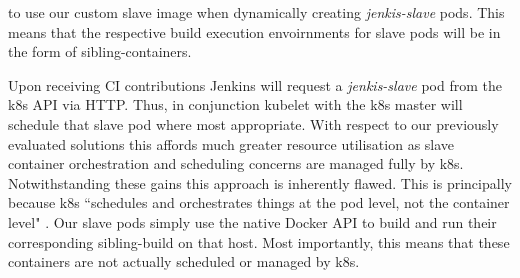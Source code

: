 \documentclass{report}
\begin{document}
to use our custom slave image when dynamically creating \textit{jenkis-slave} pods. 
This means that the respective build execution envoirnments for slave pods will be in the form of sibling-containers. 
\par
Upon receiving CI contributions Jenkins will request a \textit{jenkis-slave} pod from the k8s API via HTTP. 
Thus, in conjunction kubelet with the k8s master will schedule that slave pod where most appropriate. 
With respect to our previously evaluated solutions this affords much greater resource utilisation as 
slave container orchestration and scheduling concerns are managed fully by k8s.
Notwithstanding these gains this approach is inherently flawed.
This is principally because k8s ``schedules and
orchestrates things at the pod level, not the container level" \citep{Rensin}. Our
slave pods simply use the native
Docker API to build and run their corresponding sibling-build on that host. 
Most importantly, this means that these containers are not actually scheduled or managed
by k8s.
\end{document}

